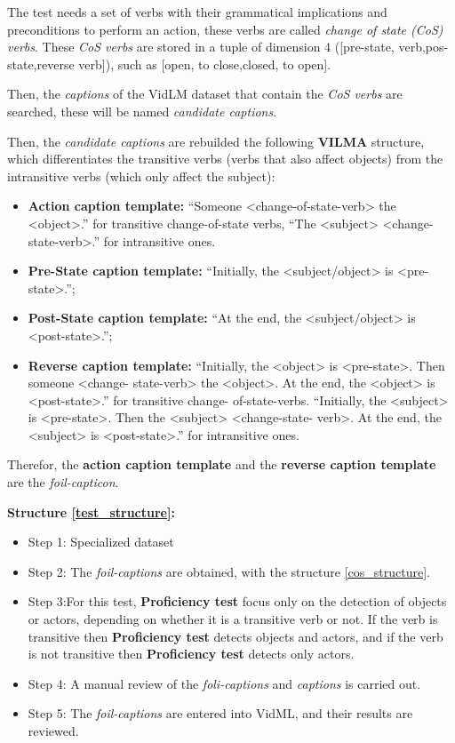 The test needs a set of verbs with their grammatical implications and preconditions to perform an action, these verbs are called \textit{change of state (CoS) verbs}. These \textit{CoS verbs} are stored in a tuple of dimension 4 ([pre-state, verb,pos-state,reverse verb]), such as [open, to close,closed, to open].

Then, the \textit{captions} of the VidLM dataset that contain the \textit{CoS verbs} are searched, these will be named \textit{candidate captions}.

Then, the \textit{candidate captions} are rebuilded the following \textbf{VILMA} structure, which differentiates the transitive verbs (verbs that also affect objects) from the intransitive verbs (which only affect the subject):

\begin{itemize} \label{cos_structure}
\item \textbf{Action caption template:} “Someone <change-of-state-verb> the <object>.” for transitive change-of-state verbs, “The <subject> <change-state-verb>.” for intransitive ones.
\item \textbf{Pre-State caption template:} “Initially, the <subject/object> is <pre-state>.”;
\item \textbf{Post-State caption template:} “At the end, the <subject/object> is <post-state>.”;
\item \textbf{Reverse caption template:} “Initially, the <object> is <pre-state>. Then someone <change- state-verb> the <object>. At the end, the <object> is <post-state>.” for transitive change- of-state-verbs. “Initially, the <subject> is <pre-state>. Then the <subject> <change-state- verb>. At the end, the <subject> is <post-state>.” for intransitive ones.
\end{itemize}

Therefor, the \textbf{action caption template} and the \textbf{reverse caption template} are the \textit{foil-capticon}.

\textbf{Structure \ref{test_structure}:}
\begin{itemize}
\item Step 1: Specialized dataset
\item Step 2: The \textit{foil-captions} are obtained, with the structure \ref{cos_structure}.
\item Step 3:For this test, \textbf{Proficiency test} focus only on the detection of objects or actors, depending on whether it is a transitive verb or not. If the verb is transitive then \textbf{Proficiency test} detects objects and actors, and if the verb is not transitive then \textbf{Proficiency test} detects only actors.
\item Step 4: A manual review of the \textit{foli-captions} and \textit{captions} is carried out.
\item Step 5: The \textit{foil-captions} are entered into VidML, and their results are reviewed.
\end{itemize}

